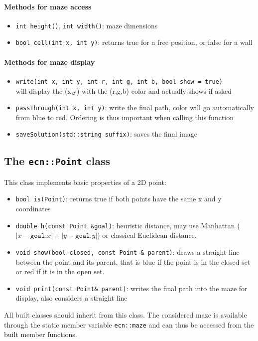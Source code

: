 \documentclass{ecnreport}
\begin{document}
\paragraph{Methods for maze access}
\begin{itemize}
 \item \texttt{int height()}, \texttt{int width()}: maze dimensions
 \item \texttt{bool cell(int x, int y)}: returns true for a free position, or false for a wall
\end{itemize}

\paragraph{Methods for maze display}
\begin{itemize}
 \item \texttt{write(int x, int y, int r, int g, int b, bool show = true)}\\
    will display the (x,y) with the (r,g,b) color and actually shows if asked
 \item \texttt{passThrough(int x, int y)}: write the final path, color will go automatically from blue to red. 
 Ordering is thus important when calling this function
 \item \texttt{saveSolution(std::string suffix)}: saves the final image
\end{itemize}

\subsection{The \texttt{ecn::Point} class}\label{ptClass}

This class implements basic properties of a 2D point:

\begin{itemize}
 \item \texttt{bool is(Point)}: returns true if both points have the same x and y coordinates
 \item \texttt{double h(const Point \&goal)}: heuristic distance, may use Manhattan
 ($|x-\texttt{goal}.x| + |y-\texttt{goal}.y|$) or classical Euclidean distance.
 \item \texttt{void show(bool closed, const Point \& parent)}: draws a straight line between the point and its parent, that
 is blue if the point is in the closed set or red if it is in the open set.
 \item \texttt{void print(const Point\& parent)}: writes the final path into the maze for display, also considers a straight line
\end{itemize}
All built classes should inherit from this class. The considered maze is available through the static member variable \texttt{ecn::maze} and can thus
be accessed from the built member functions.
\end{document}
